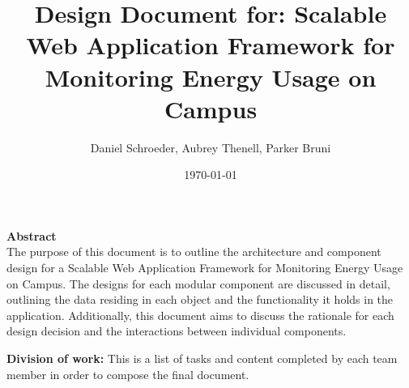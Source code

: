\documentclass[journal,10pt,onecolumn,compsoc]{IEEEtran}
\title{Design Document for: \linebreak Scalable Web Application Framework for Monitoring Energy Usage on Campus}
\author{Daniel Schroeder, Aubrey Thenell, Parker Bruni}
\date{\today}
\begin{document}
    \maketitle
    \vspace{2cm}
    \begin{center}
    \noindent \textbf{Abstract} \\
                \indent The purpose of this document is to outline the architecture and component design for a Scalable Web Application Framework for Monitoring Energy Usage on Campus. The designs for each modular component are discussed in detail, outlining the data residing in each object and the functionality it holds in the application. Additionally, this document aims to discuss the rationale for each design decision and the interactions between individual components. 
    \end{center}         
    
    \newpage
    \tableofcontents
    \newpage
       \noindent\textbf{Division of work:}
       \noindent This is a list of tasks and content completed by each team member in order to compose the final document.
       
\end{document}
